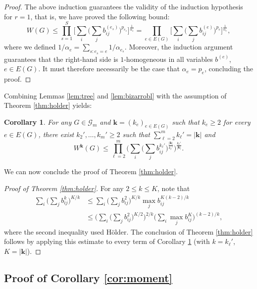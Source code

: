\documentclass[10pt,reqno]{amsart}
\newtheorem{cor}[thm]{Corollary}
\theoremstyle{definition}
\numberwithin{equation}{section}
\numberwithin{figure}{section}
\numberwithin{table}{section}
\begin{document}
\begin{proof}
The above induction guarantees the validity of the induction hypothesis
for $r=1$, that is, we have proved the following bound:
$$
	W(G) \le
	\prod_{s=1}^S
	\Bigg[
        \sum_{i}
	\Bigg(
	\sum_j b_{ij}^{(e_s)}
	\Bigg)^{p_{e_s}}
	\Bigg]^{\frac{1}{\alpha_s}} =
	\prod_{e\in E(G)}
	\Bigg[
        \sum_{i}
	\Bigg(
	\sum_j b_{ij}^{(e)}
	\Bigg)^{p_e}
	\Bigg]^{\frac{1}{\alpha_e}},
$$
where we defined $1/\alpha_e = \sum_{s:e_s=e}1/\alpha_{e_s}$. Moreover, 
the induction argument guarantees that the right-hand side is 
$1$-homogeneous in all variables $b^{(e)}$, $e\in E(G)$. It must therefore 
necessarily be the case that $\alpha_e = p_e$, concluding the proof. 
\end{proof}

Combining Lemmas \ref{lem:tree} and \ref{lem:bizarrobl} with the
assumption of Theorem \ref{thm:holder} yields:

\begin{cor}
\label{cor:preholder}
For any $G\in\mathcal{G}_m$ and $\mathbf{k}=(k_e)_{e\in E(G)}$ such that
$k_e\ge 2$ for every $e\in E(G)$, there exist 
$k_2',\ldots,k_m'\ge 2$ such that $\sum_{\ell=2}^mk_\ell'=|\mathbf{k}|$ and
$$
	W^{\mathbf{k}}(G) \le
	\prod_{\ell=2}^m
	\Bigg(
	\sum_i\Bigg(
	\sum_j b_{ij}^{k_\ell'}\Bigg)^{\frac{|\mathbf{k}|}{k_\ell'}}
	\Bigg)^{\frac{k_\ell'}{|\mathbf{k}|}}.
$$
\end{cor}

We can now conclude the proof of Theorem \ref{thm:holder}.

\begin{proof}[Proof of Theorem \ref{thm:holder}]
For any $2\le k\le K$, note that
\begin{align*}
	\sum_i\Bigg(\sum_j b_{ij}^k\Bigg)^{K/k} &\le
	\sum_i
	\Bigg(\sum_j b_{ij}^2\Bigg)^{K/k}
	\max_jb_{ij}^{K(k-2)/k}
	\\ &\le
	\Bigg(\sum_i\Bigg(\sum_j b_{ij}^2\Bigg)^{K/2}\Bigg)^{2/k}
	\Bigg(\sum_i\max_jb_{ij}^K\Bigg)^{(k-2)/k},
\end{align*}
where the second inequality used H\"older. The conclusion of Theorem
\ref{thm:holder} follows by applying this estimate to every term of
Corollary \ref{cor:preholder} (with $k=k_\ell'$, $K=|\mathbf{k}|$).
\end{proof}

\subsection{Proof of Corollary \ref{cor:moment}}
\label{sec:complex}
\end{document}
